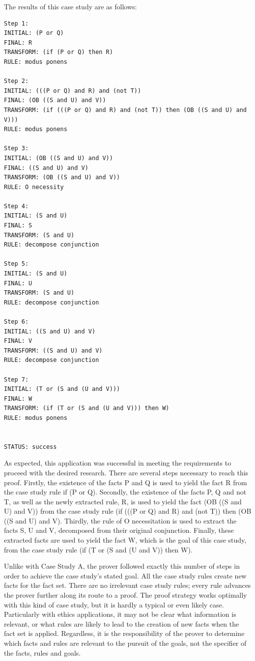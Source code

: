 \documentclass{l4proj}
\begin{document}
The results of this case study are as follows: 
\begin{verbatim}
Step 1: 
INITIAL: (P or Q)
FINAL: R
TRANSFORM: (if (P or Q) then R)
RULE: modus ponens

Step 2: 
INITIAL: (((P or Q) and R) and (not T))
FINAL: (OB ((S and U) and V))
TRANSFORM: (if (((P or Q) and R) and (not T)) then (OB ((S and U) and V)))
RULE: modus ponens

Step 3: 
INITIAL: (OB ((S and U) and V))
FINAL: ((S and U) and V)
TRANSFORM: (OB ((S and U) and V))
RULE: O necessity

Step 4: 
INITIAL: (S and U)
FINAL: S
TRANSFORM: (S and U)
RULE: decompose conjunction

Step 5: 
INITIAL: (S and U)
FINAL: U
TRANSFORM: (S and U)
RULE: decompose conjunction

Step 6: 
INITIAL: ((S and U) and V)
FINAL: V
TRANSFORM: ((S and U) and V)
RULE: decompose conjunction

Step 7: 
INITIAL: (T or (S and (U and V)))
FINAL: W
TRANSFORM: (if (T or (S and (U and V))) then W)
RULE: modus ponens


STATUS: success

\end{verbatim}
As expected, this application was successful in meeting the requirements to proceed with the desired research. There are several steps necessary to reach this proof. Firstly, the existence of the facts P and Q is used to yield the fact R from the case study rule if (P or Q). Secondly, the existence of the facts P, Q and not T, as well as the newly extracted rule, R, is used to yield the fact (OB ((S and U) and V)) from the case study rule (if (((P or Q) and R) and (not T)) then (OB ((S and U) and V). Thirdly, the rule of O necessitation is used to extract the facts S, U and V, decomposed from their original conjunction. Finally, these extracted facts are used to yield the fact W, which is the goal of this case study, from the case study rule (if (T or (S and (U and V)) then W). 

Unlike with Case Study A, the prover followed exactly this number of steps in order to achieve the case study's stated goal. All the case study rules create new facts for the fact set. There are no irrelevant case study rules; every rule advances the prover further along its route to a proof. The proof strategy works optimally with this kind of case study, but it is hardly a typical or even likely case. Particularly with ethics applications, it may not be clear what information is relevant, or what rules are likely to lead to the creation of new facts when the fact set is applied. Regardless, it is the responsibility of the prover to determine which facts and rules are relevant to the pursuit of the goals, not the specifier of the facts, rules and goals. 
\end{document}
